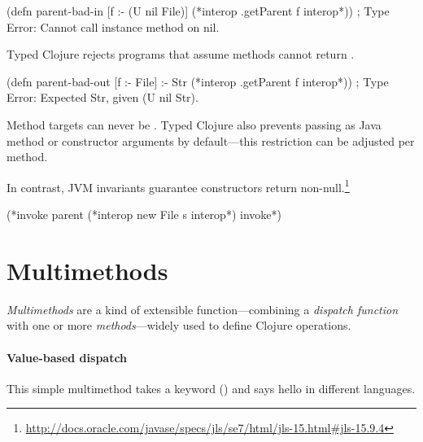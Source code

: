 \begin{cljlisting}
(defn parent-bad-in [f :- (U nil File)]
  (*interop .getParent f interop*)) ; Type Error: Cannot call instance method on nil.
\end{cljlisting}

Typed Clojure rejects programs that assume methods cannot return .

\begin{cljlisting}
(defn parent-bad-out [f :- File] :- Str
  (*interop .getParent f interop*)) ; Type Error: Expected Str, given (U nil Str).
\end{cljlisting}

Method targets can never be .
Typed Clojure also prevents passing  as Java method or
constructor arguments by default---this restriction can be
adjusted per method.

%
%
%
In contrast, JVM invariants guarantee constructors return non-null.\footnote{\url{http://docs.oracle.com/javase/specs/jls/se7/html/jls-15.html\#jls-15.9.4}}
%
\begin{exmp}
\begin{cljlisting}
(*invoke parent (*interop new File s interop*) invoke*)
\end{cljlisting}
\end{exmp}


\section{Multimethods}

\label{sec:multioverview}

\emph{Multimethods} are a kind of extensible function---combining a \emph{dispatch function} with 
one or more \emph{methods}---widely used to define Clojure operations.

\paragraph{Value-based dispatch}
This simple multimethod takes a keyword () and says hello in different languages.%

